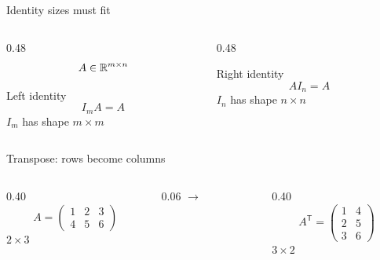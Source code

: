 \begin{frame}{Identity sizes must fit}
  \begin{columns}[T,onlytextwidth]
    \begin{column}{0.48\textwidth}
      \[
      A\in\mathbb{R}^{m\times n}
      \]
      \begin{block}{Left identity}
        \[
        I_mA=A
        \]
        $I_m$ has shape $m\times m$
      \end{block}
    \end{column}
    \begin{column}{0.48\textwidth}
      \vspace{0.35cm}
      \begin{exampleblock}{Right identity}
        \[
        AI_n=A
        \]
        $I_n$ has shape $n\times n$
      \end{exampleblock}
    \end{column}
  \end{columns}

  \vspace{0.45cm}
\end{frame}

\begin{frame}{Transpose: rows become columns}
  \begin{columns}[T,onlytextwidth]
    \begin{column}{0.40\textwidth}
      \[
      A=\begin{pmatrix}
      1&2&3\\
      4&5&6
      \end{pmatrix}
      \]
      \centering $2\times3$
    \end{column}
    \begin{column}{0.06\textwidth}
      \centering\vspace{0.85cm}\Large $\longrightarrow$
    \end{column}
    \begin{column}{0.40\textwidth}
      \[
      A^{\mathsf T}=\begin{pmatrix}
      1&4\\
      2&5\\
      3&6
      \end{pmatrix}
      \]
      \centering $3\times2$
    \end{column}
  \end{columns}
\end{frame}

